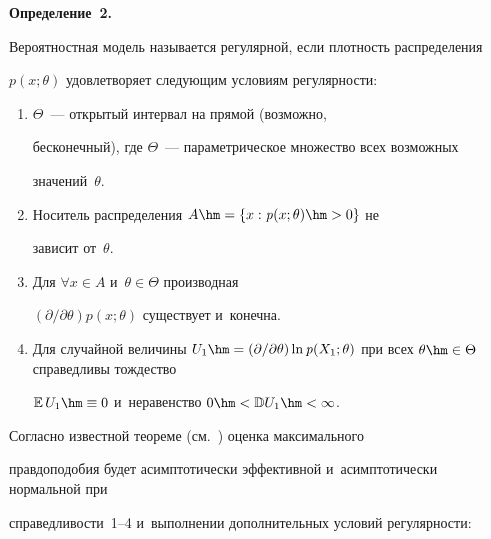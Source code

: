 \smallskip





\noindent


\textbf{Определение~2.}


Вероятностная модель называется регулярной, если плотность распределения 


$\mathit{p}(x;\theta)$ удовлетворяет следующим условиям регулярности:




\begin{enumerate}[1.]


\item $\Theta$~--- открытый интервал на прямой (возможно, 


бесконечный), где $\Theta$~--- параметрическое множество всех возможных 


значений~$\theta$.


\item  Носитель распределения $A \hm= \{x: \mathit{p}(x;\theta)\hm > 0\}$ не 


зависит от~$\theta$.


\item Для $\forall x \in A$ и~$\theta \in \Theta$ производная 


$({\partial}/{\partial \theta}) \mathit{p}(x; \theta)$ существует и~конечна.


\item Для случайной величины $U_1 \hm= ({\partial}/{\partial \theta}) 


\ln \mathit{p}(X_1; \theta)$ при всех $\theta \hm\in \Theta$ справедливы тождество 


$\mathbb{E}\,U_1 \hm\equiv 0$ и~неравенство $0 \hm< \mathbb{D}U_1\hm < \infty$.


\end{enumerate}











Согласно известной теореме (см.~\cite{lagutin}) оценка максимального 


правдоподобия будет асимптотически эффективной и~асимптотически нормальной при 


справедливости~1--4 и~выполнении дополнительных условий регулярности:


\noindent


